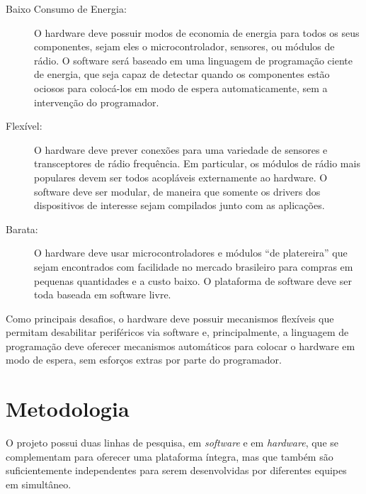 \documentclass[titlepage,12pt]{article}
\begin{document}
\begin{description}
%
\item[Baixo Consumo de Energia:]
  O hardware deve possuir modos de economia de energia para todos os seus
  componentes, sejam eles o microcontrolador, sensores, ou módulos de rádio.
  O software será baseado em uma linguagem de programação ciente de energia,
  que seja capaz de detectar quando os componentes estão ociosos para
  colocá-los em modo de espera automaticamente, sem a intervenção do
  programador.
%
\item[Flexível:]
  O hardware deve prever conexões para uma variedade de sensores e
  transceptores de rádio frequência.
  Em particular, os módulos de rádio mais populares devem ser todos acopláveis
  externamente ao hardware.
  O software deve ser modular, de maneira que somente os drivers dos
  dispositivos de interesse sejam compilados junto com as aplicações.
%
\item[Barata:]
  O hardware deve usar microcontroladores e módulos ``de platereira'' que sejam
  encontrados com facilidade no mercado brasileiro para compras em pequenas
  quantidades e a custo baixo.
  O plataforma de software deve ser toda baseada em software livre.
%
\end{description}

Como principais desafios, o hardware deve possuir mecanismos flexíveis que
permitam desabilitar periféricos via software e, principalmente, a linguagem de
programação deve oferecer mecanismos automáticos para colocar o hardware em
modo de espera, sem esforços extras por parte do programador.

\section{Metodologia}

O projeto possui duas linhas de pesquisa, em \emph{software} e em
\emph{hardware}, que se complementam para oferecer uma plataforma íntegra, mas
que também são suficientemente independentes para serem desenvolvidas por
diferentes equipes em simultâneo.
\end{document}
